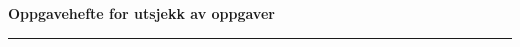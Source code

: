 \centerline{\bf Oppgavehefte for utsjekk av oppgaver}  \bigskip


\bigskip 
 
\hrule

\vfil \eject

